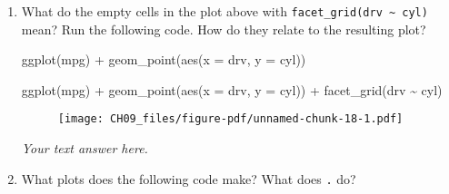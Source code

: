 \documentclass[
  letterpaper,
  DIV=11,
  numbers=noendperiod]{scrreprt}
\newenvironment{Shaded}{\begin{snugshade}}{\end{snugshade}}
\newcommand{\AttributeTok}[1]{\textcolor[rgb]{0.40,0.45,0.13}{#1}}
\newcommand{\FunctionTok}[1]{\textcolor[rgb]{0.28,0.35,0.67}{#1}}
\newcommand{\NormalTok}[1]{\textcolor[rgb]{0.00,0.23,0.31}{#1}}
\newcommand{\SpecialCharTok}[1]{\textcolor[rgb]{0.37,0.37,0.37}{#1}}
\begin{document}
\begin{enumerate}
\begin{tcolorbox}
\begin{figure}[H]
{  }

  \end{figure}

  \end{tcolorbox}
\item
  What do the empty cells in the plot above with
  \texttt{facet\_grid(drv\ \textasciitilde{}\ cyl)} mean? Run the
  following code. How do they relate to the resulting plot?

\begin{Shaded}
\begin{Highlighting}[]
\FunctionTok{ggplot}\NormalTok{(mpg) }\SpecialCharTok{+} 
  \FunctionTok{geom\_point}\NormalTok{(}\FunctionTok{aes}\NormalTok{(}\AttributeTok{x =}\NormalTok{ drv, }\AttributeTok{y =}\NormalTok{ cyl))}
\end{Highlighting}
\end{Shaded}

  \begin{tcolorbox}[enhanced jigsaw, left=2mm, rightrule=.15mm, bottomtitle=1mm, opacitybacktitle=0.6, leftrule=.75mm, opacityback=0, colframe=quarto-callout-note-color-frame, bottomrule=.15mm, coltitle=black, toptitle=1mm, colback=white, titlerule=0mm, colbacktitle=quarto-callout-note-color!10!white, title={Answer}, toprule=.15mm, breakable, arc=.35mm]

\begin{Shaded}
\begin{Highlighting}[]
\FunctionTok{ggplot}\NormalTok{(mpg) }\SpecialCharTok{+} 
  \FunctionTok{geom\_point}\NormalTok{(}\FunctionTok{aes}\NormalTok{(}\AttributeTok{x =}\NormalTok{ drv, }\AttributeTok{y =}\NormalTok{ cyl)) }\SpecialCharTok{+}
  \FunctionTok{facet\_grid}\NormalTok{(drv }\SpecialCharTok{\textasciitilde{}}\NormalTok{ cyl)}
\end{Highlighting}
\end{Shaded}

  \begin{figure}[H]

  {\centering \texttt{[image: CH09\_files/figure-pdf/unnamed-chunk-18-1.pdf]}

  }

  \end{figure}

  \emph{Your text answer here.}

  \end{tcolorbox}
\item
  What plots does the following code make? What does \texttt{.} do?


\end{enumerate}
\end{document}
